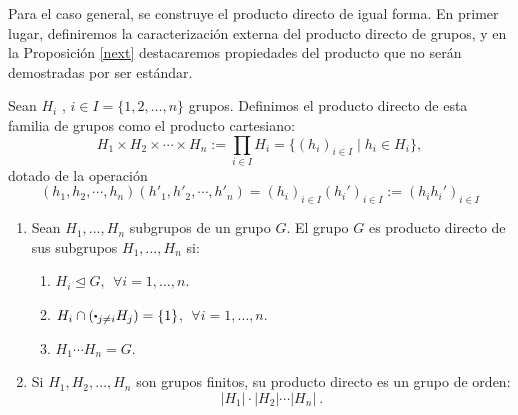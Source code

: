 










Para el caso general, se construye el producto directo de igual forma. En primer lugar, definiremos la caracterización externa del producto directo de grupos, y en la Proposición \ref{next} destacaremos propiedades del producto que no serán demostradas por ser estándar.

Sean $H_i$ , $ i \in I = \{ 1,2,\ldots,n \}$ grupos. Definimos el producto directo de esta familia de grupos como el producto cartesiano:
\[
    H_1 \times H_2 \times \cdots\times H_n := \prod_{i\in I } H_i = \{ (h_i)_{i \in I} \mid h_i \in H_i \} ,
\]
dotado de la operación
\[
    (h_1,h_2,\cdots,h_n)(h'_1,h'_2,\cdots,h'_n) = (h_i)_{i \in I} (h_i')_{i \in I} := (h_i h_i')_{i \in I}
\]




\begin{proposition} \label{next}
\hfill
    \begin{enumerate}
        \setlength\itemsep{0.3em}


    \item  Sean $H_1,\ldots,H_n$ subgrupos de un grupo $G$. El grupo $G$ es producto directo de sus subgrupos $H_1, \ldots, H_n$ si:
        \begin{enumerate}
            \setlength\itemsep{0.1em}
    
            \item $H_i \trianglelefteq G$, $\; \forall i = 1,\ldots, n$.
            \item $H_i \cap (\bigcdot_ {j \not = i} H_j) =\{1\}$, $\; \forall i =1,\ldots ,n$.
            \item $H_1 \cdots H_n = G$.
        \end{enumerate}
    
    \item   Si $H_1, H_2, \ldots , H_n$ son grupos finitos, su producto directo es un grupo de orden:
        \[
            |H_1|\cdot|H_2|\cdots |H_n|\:.
        \]
            \end{enumerate}
\end{proposition}










